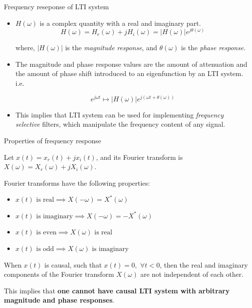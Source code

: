 \documentclass{beamer}
\begin{document}
\begin{frame}{Frequency reseponse of LTI system}

\begin{itemize}
\item $H(\omega)$ is a complex quantity with a real and imaginary part.
\[ H(\omega) = H_r(\omega) + jH_i(\omega) = \left|H(\omega)\right|e^{j\theta(\omega)}\]

where, $\left|H(\omega)\right|$ is the \textit{magnitude response}, and $\theta(\omega)$ is the \textit{phase response}.

\item The magnitude and phase response values are the amount of attenuation and the amount of phase shift introduced to an eigenfunction by an LTI system. i.e.

\[ e^{j\omega t} \mapsto \left|H(\omega)\right|e^{j\left(\omega t + \theta(\omega)\right)} \]

\item This implies that LTI system can be used for implementing \textit{frequency selective} filters, which manipulate the frequency content of any signal.
\end{itemize}

\end{frame}

\begin{frame}{Properties of frequency response}

Let $x(t) = x_r(t) + jx_i(t)$, and its Fourier transform is $X(\omega) = X_r(\omega) + jX_i(\omega).$
\vspace{2mm}

Fourier transforms have the following properties:
\begin{itemize}
\item $x(t) \text{ is real} \implies X(-\omega) = X^*(\omega) $
\item $x(t) \text{ is imaginary} \implies X(-\omega) = -X^*(\omega) $
\item $x(t) \text{ is even} \implies X(\omega) \text{ is real} $
\item $x(t) \text{ is odd} \implies X(\omega) \text{ is imaginary} $
\end{itemize}
\vspace{2mm}

When $x(t)$ is causal, such that $x(t) = 0, \,\, \forall t < 0$, then the real and imaginary components of the Fourier transform $X(\omega)$ are not independent of each other.
\vspace{2mm}

This implies that \textbf{one cannot have causal LTI system with arbitrary magnitude and phase responses}.

\end{frame}
\end{document}
